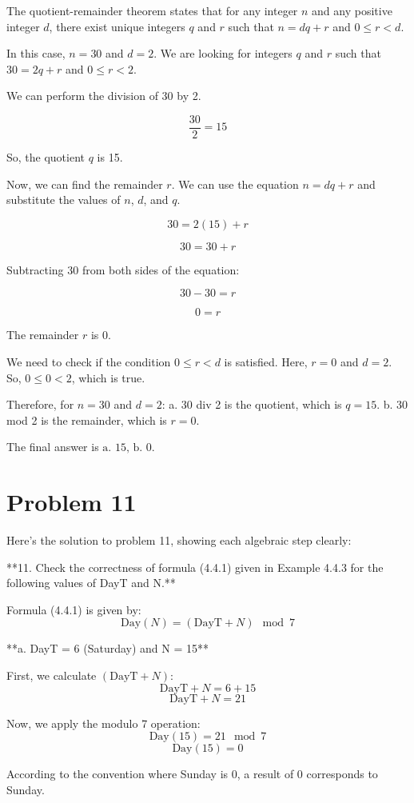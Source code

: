 \documentclass{article}
\begin{document}
The quotient-remainder theorem states that for any integer $n$ and any positive integer $d$, there exist unique integers $q$ and $r$ such that $n = dq + r$ and $0 \le r < d$.

In this case, $n = 30$ and $d = 2$. We are looking for integers $q$ and $r$ such that $30 = 2q + r$ and $0 \le r < 2$.

We can perform the division of 30 by 2.

$$ \frac{30}{2} = 15 $$

So, the quotient $q$ is 15.

Now, we can find the remainder $r$. We can use the equation $n = dq + r$ and substitute the values of $n$, $d$, and $q$.

$$ 30 = 2(15) + r $$

$$ 30 = 30 + r $$

Subtracting 30 from both sides of the equation:

$$ 30 - 30 = r $$

$$ 0 = r $$

The remainder $r$ is 0.

We need to check if the condition $0 \le r < d$ is satisfied.
Here, $r = 0$ and $d = 2$.
So, $0 \le 0 < 2$, which is true.

Therefore, for $n=30$ and $d=2$:
a. 30 div 2 is the quotient, which is $q = 15$.
b. 30 mod 2 is the remainder, which is $r = 0$.

The final answer is $\boxed{\text{a. 15, b. 0}}$.

\newpage

\section*{Problem 11}
Here's the solution to problem 11, showing each algebraic step clearly:

**11. Check the correctness of formula (4.4.1) given in Example 4.4.3 for the following values of DayT and N.**

Formula (4.4.1) is given by:
$$ \text{Day}(N) = (\text{DayT} + N) \mod 7 $$

**a. DayT = 6 (Saturday) and N = 15**

First, we calculate $(\text{DayT} + N)$:
$$ \text{DayT} + N = 6 + 15 $$
$$ \text{DayT} + N = 21 $$

Now, we apply the modulo 7 operation:
$$ \text{Day}(15) = 21 \mod 7 $$
$$ \text{Day}(15) = 0 $$

According to the convention where Sunday is 0, a result of 0 corresponds to Sunday.
\end{document}
